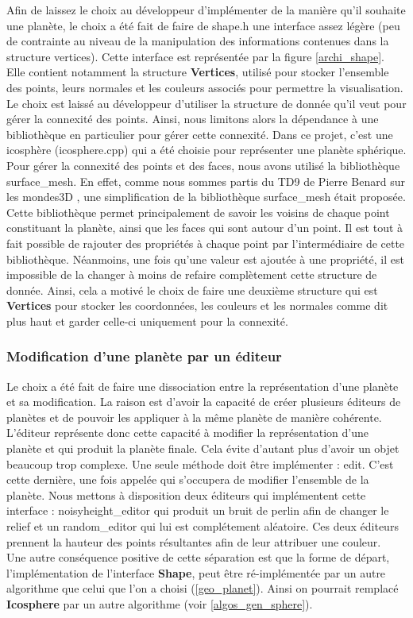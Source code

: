 \documentclass[a4paper]{article}
\begin{document}
Afin de laissez le choix au développeur d'implémenter de la manière qu'il souhaite une planète, le choix a été fait de faire de shape.h une interface assez légère (peu de contrainte au niveau de la manipulation des informations contenues dans la structure vertices). Cette interface est représentée par la figure \ref{archi_shape}. Elle contient notamment la structure \textbf{Vertices}, utilisé pour stocker l'ensemble des points, leurs normales et les couleurs associés pour permettre la visualisation. Le choix est laissé au développeur d'utiliser la structure de donnée qu'il veut pour gérer la connexité des points. Ainsi, nous limitons alors la dépendance à une bibliothèque en particulier pour gérer cette connexité.
Dans ce projet, c'est une icosphère (icosphere.cpp) qui a été choisie pour représenter une planète sphérique. Pour gérer la connexité des points et des faces, nous avons utilisé la bibliothèque surface\_mesh. En effet, comme nous sommes partis du TD9 de Pierre Benard sur les mondes3D \cite{TD_3D}, une simplification de la bibliothèque surface\_mesh était proposée. Cette bibliothèque permet principalement de savoir les voisins de chaque point constituant la planète, ainsi que les faces qui sont autour d'un point. Il est tout à fait possible de rajouter des propriétés à chaque point par l'intermédiaire de cette bibliothèque. Néanmoins, une fois qu'une valeur est ajoutée à une propriété, il est impossible de la changer à moins de refaire complètement cette structure de donnée. Ainsi, cela a motivé le choix de faire une deuxième structure qui est \textbf{Vertices} pour stocker les coordonnées, les couleurs et les normales comme dit plus haut et garder celle-ci uniquement pour la connexité.

\subsubsection{Modification d'une planète par un éditeur}

Le choix a été fait de faire une dissociation entre la représentation d'une planète et sa modification. La raison est d'avoir la capacité de créer plusieurs éditeurs de planètes et de pouvoir les appliquer à la même planète de manière cohérente. L'éditeur représente donc cette capacité à modifier la représentation d'une planète et qui produit la planète finale. Cela évite d'autant plus d'avoir un objet beaucoup trop complexe. Une seule méthode doit être implémenter : edit. C'est cette dernière, une fois appelée qui s'occupera de modifier l'ensemble de la planète. Nous mettons à disposition deux éditeurs qui implémentent cette interface : noisyheight\_editor qui produit un bruit de perlin afin de changer le relief et un random\_editor qui lui est complétement aléatoire. Ces deux éditeurs prennent la hauteur des points résultantes afin de leur attribuer une couleur.\\
Une autre conséquence positive de cette séparation est que la forme de départ, l'implémentation de l'interface \textbf{Shape}, peut être ré-implémentée par un autre algorithme que celui que l'on a choisi (\ref{geo_planet}). Ainsi on pourrait remplacé \textbf{Icosphere} par un autre algorithme (voir \ref{algos_gen_sphere}).\\
\end{document}
